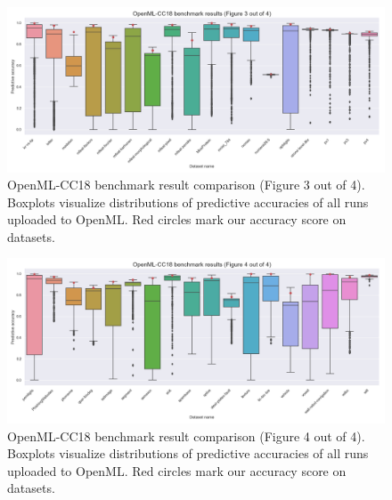 \begin{figure}
    \includegraphics[width=\textwidth]{../img/openml-boxplot2.png}
    \caption[OpenML-CC18 benchmark result comparison (Figure 3 out of 4)]{
	OpenML-CC18 benchmark result comparison (Figure 3 out of 4).    
    Boxplots visualize distributions of predictive accuracies of all
    runs uploaded to OpenML. Red circles mark our accuracy score on datasets.}
    \label{fig:OpenML:boxplot:2}
\end{figure}

\begin{figure}
    \includegraphics[width=\textwidth]{../img/openml-boxplot3.png}
    \caption[OpenML-CC18 benchmark result comparison (Figure 4 out of 4)]{
    OpenML-CC18 benchmark result comparison (Figure 4 out of 4).
    Boxplots visualize distributions of predictive accuracies of all
    runs uploaded to OpenML. Red circles mark our accuracy score on datasets.}
    \label{fig:OpenML:boxplot:3}
\end{figure}